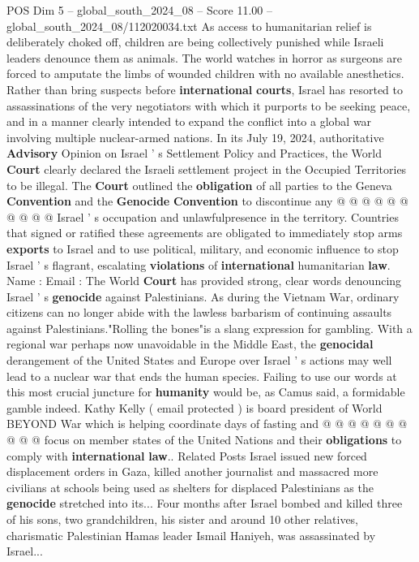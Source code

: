 \begin{textsample}{POS Dim 5 – global\_south\_2024\_08 – Score 11.00 – global\_south\_2024\_08/112020034.txt}
As access to humanitarian relief is deliberately choked off, children are being collectively punished while Israeli leaders denounce them as animals.
The world watches in horror as surgeons are forced to amputate the limbs of wounded children with no available anesthetics.
Rather than bring suspects before \textbf{international} \textbf{courts}, Israel has resorted to assassinations of the very negotiators with which it purports to be seeking peace, and in a manner clearly intended to expand the conflict into a global war involving multiple nuclear-armed nations.
In its July 19, 2024, authoritative \textbf{Advisory} Opinion on Israel ' s Settlement Policy and Practices, the World \textbf{Court} clearly declared the Israeli settlement project in the Occupied Territories to be illegal.
The \textbf{Court} outlined the \textbf{obligation} of all parties to the Geneva \textbf{Convention} and the \textbf{Genocide} \textbf{Convention} to discontinue any @ @ @ @ @ @ @ @ @ @ Israel ' s occupation and unlawfulpresence in the territory.
Countries that signed or ratified these agreements are obligated to immediately stop arms \textbf{exports} to Israel and to use political, military, and economic influence to stop Israel ' s flagrant, escalating \textbf{violations} of \textbf{international} humanitarian \textbf{law}.
Name : Email : The World \textbf{Court} has provided strong, clear words denouncing Israel ' s \textbf{genocide} against Palestinians.
As during the Vietnam War, ordinary citizens can no longer abide with the lawless barbarism of continuing assaults against Palestinians."Rolling the bones"is a slang expression for gambling.
With a regional war perhaps now unavoidable in the Middle East, the \textbf{genocidal} derangement of the United States and Europe over Israel ' s actions may well lead to a nuclear war that ends the human species.
Failing to use our words at this most crucial juncture for \textbf{humanity} would be, as Camus said, a formidable gamble indeed.
Kathy Kelly ( email protected ) is board president of World BEYOND War which is helping coordinate days of fasting and @ @ @ @ @ @ @ @ @ @ focus on member states of the United Nations and their \textbf{obligations} to comply with \textbf{international} \textbf{law}..
Related Posts Israel issued new forced displacement orders in Gaza, killed another journalist and massacred more civilians at schools being used as shelters for displaced Palestinians as the \textbf{genocide} stretched into its...
Four months after Israel bombed and killed three of his sons, two grandchildren, his sister and around 10 other relatives, charismatic Palestinian Hamas leader Ismail Haniyeh, was assassinated by Israel...

\end{textsample}
